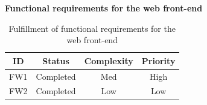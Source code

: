 \textbf{Functional requirements for the web front-end}

\begin{table}[H]
\begin{center}
\begin{tabular}{ | c | c | c | c |}
  \hline
  \textbf{ID} & \textbf{Status} & \textbf{Complexity} & \textbf{Priority}\\
  \hline\noalign{\smallskip}\noalign{\smallskip}\hline
  FW1	& Completed & Med & High \\
  FW2	& Completed & Low & Low \\
  \hline
\end{tabular}
\end{center}
\caption{Fulfillment of functional requirements for the web front-end}
\label{table:fulfillemntofwebfront-end}
\end{table}

